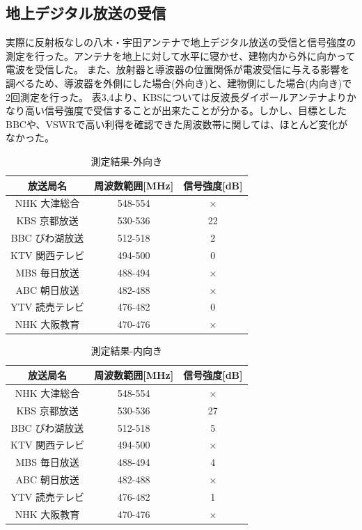 \documentclass[dvipdfmx,autodetect-engine,titlepage]{jsarticle}
\begin{document}
\subsection{地上デジタル放送の受信}
実際に反射板なしの八木・宇田アンテナで地上デジタル放送の受信と信号強度の測定を行った。アンテナを地上に対して水平に寝かせ、建物内から外に向かって電波を受信した。
また、放射器と導波器の位置関係が電波受信に与える影響を調べるため、導波器を外側にした場合(外向き)と、建物側にした場合(内向き)で2回測定を行った。
表3,4より、KBSについては反波長ダイポールアンテナよりかなり高い信号強度で受信することが出来たことが分かる。しかし、目標としたBBCや、VSWRで高い利得を確認できた周波数帯に関しては、ほとんど変化がなかった。\\


\begin{table}[H]
  \centering
  \caption{測定結果-外向き}\label{fig:表3}
  \begin{tabular}{|c|c|c|}
  \hline
  放送局名       & 周波数範囲{[}MHz{]} & 信号強度{[}dB{]} \\ \hline
  NHK 大津総合   & 548-554        & ×            \\ \hline
  KBS 京都放送   & 530-536        & 22            \\ \hline
  BBC  びわ湖放送 & 512-518        & 2            \\ \hline
  KTV 関西テレビ  & 494-500        & 0            \\ \hline
  MBS 毎日放送   & 488-494        & ×            \\ \hline
  ABC 朝日放送   & 482-488        & ×            \\ \hline
  YTV 読売テレビ  & 476-482        & 0            \\ \hline
  NHK 大阪教育   & 470-476        & ×            \\ \hline
  \end{tabular}
  \end{table}

  \begin{table}[H]
    \centering
    \caption{測定結果-内向き}\label{fig:表4}
    \begin{tabular}{|c|c|c|}
    \hline
    放送局名       & 周波数範囲{[}MHz{]} & 信号強度{[}dB{]} \\ \hline
    NHK 大津総合   & 548-554        & ×            \\ \hline
    KBS 京都放送   & 530-536        & 27            \\ \hline
    BBC  びわ湖放送 & 512-518        & 5            \\ \hline
    KTV 関西テレビ  & 494-500        & ×            \\ \hline
    MBS 毎日放送   & 488-494        & 4            \\ \hline
    ABC 朝日放送   & 482-488        & ×            \\ \hline
    YTV 読売テレビ  & 476-482        & 1            \\ \hline
    NHK 大阪教育   & 470-476        & ×            \\ \hline
    \end{tabular}
    \end{table}
\end{document}

